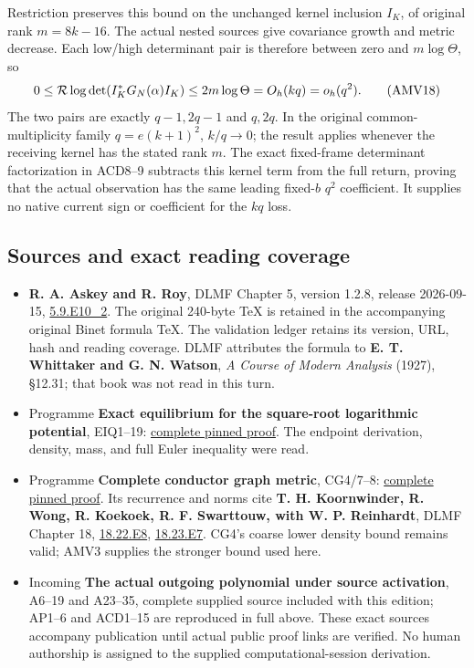 \documentclass[11pt]{article}
\providecommand{\tightlist}{}
\begin{document}
Restriction preserves this bound on the unchanged kernel inclusion \(I_K\), of original rank \(m=8k-16\). The actual nested sources give covariance growth and metric decrease. Each low/high determinant pair is therefore between zero and \(m\log\Theta\), so \[
0\le{\cal R}\log\det(I_K^*G_N(\alpha)I_K)
\le2m\log\Theta=O_h(kq)=o_h(q^2).
\tag{AMV18}
\] The two pairs are exactly \(q-1,2q-1\) and \(q,2q\). In the original common-multiplicity family \(q=e(k+1)^2\), \(k/q\to0\); the result applies whenever the receiving kernel has the stated rank \(m\). The exact fixed-frame determinant factorization in ACD8--9 subtracts this kernel term from the full return, proving that the actual observation has the same leading fixed-\(b\) \(q^2\) coefficient. It supplies no native current sign or coefficient for the \(kq\) loss.

\subsection{Sources and exact reading coverage}\label{sources-and-exact-reading-coverage}

\begin{itemize}
\tightlist
\item
  \textbf{R. A. Askey and R. Roy}, DLMF Chapter 5, version 1.2.8, release 2026-09-15, \href{https://dlmf.nist.gov/5.9.E10_2}{5.9.E10\_2}. The original 240-byte TeX is retained in the accompanying original Binet formula TeX. The validation ledger retains its version, URL, hash and reading coverage. DLMF attributes the formula to \textbf{E. T. Whittaker and G. N. Watson}, \emph{A Course of Modern Analysis} (1927), §12.31; that book was not read in this turn.
\item
  Programme \textbf{Exact equilibrium for the square-root logarithmic potential}, EIQ1--19: \href{https://github.com/KokunoYumeto/zeta-function-research-reader/blob/5992ad50c0f2a06921f1fcaded7b4e38097c0739/workbenches/splitzero-tandem/continuations/20260920-original-kernel-mixed-determinants/providers/09_INPUT_CUMULATIVE_PROOFS.tex\#L4381}{complete pinned proof}. The endpoint derivation, density, mass, and full Euler inequality were read.
\item
  Programme \textbf{Complete conductor graph metric}, CG4/7--8: \href{https://github.com/KokunoYumeto/zeta-function-research-reader/blob/0fd693c844aad9117e30ec447c59864a28af10f3/workbenches/splitzero-tandem/continuations/20260921-native-spectral-real-pair/003/COMPLETE_CONDUCTOR_GRAPH_METRIC.tex}{complete pinned proof}. Its recurrence and norms cite \textbf{T. H. Koornwinder, R. Wong, R. Koekoek, R. F. Swarttouw, with W. P. Reinhardt}, DLMF Chapter 18, \href{https://dlmf.nist.gov/18.22.E8}{18.22.E8}, \href{https://dlmf.nist.gov/18.23.E7}{18.23.E7}. CG4's coarse lower density bound remains valid; AMV3 supplies the stronger bound used here.
\item
  Incoming \textbf{The actual outgoing polynomial under source activation}, A6--19 and A23--35, complete supplied source included with this edition; AP1--6 and ACD1--15 are reproduced in full above. These exact sources accompany publication until actual public proof links are verified. No human authorship is assigned to the supplied computational-session derivation.
\end{itemize}
\end{document}
